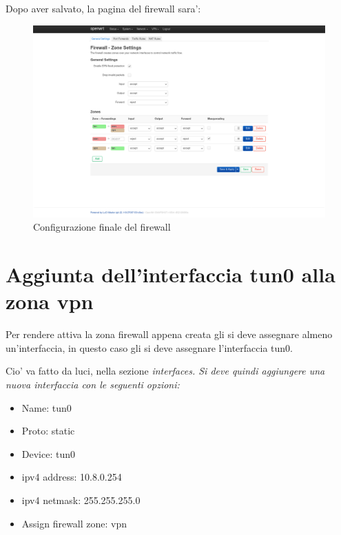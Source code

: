 Dopo aver salvato, la pagina del firewall sara':

\begin{figure}[H]
    \centering
    \includegraphics[width=0.9\linewidth]{immagini/LuCI_firewall_end}
    \caption{Configurazione finale del firewall}
    \label{fig:luci-firewall-end}
\end{figure}

\section{Aggiunta dell'interfaccia tun0 alla zona vpn}

Per rendere attiva la zona firewall appena creata gli si deve assegnare almeno un'interfaccia, in questo caso gli si deve assegnare l'interfaccia tun0.

Cio' va fatto da luci, nella sezione \it{interfaces}. Si deve quindi aggiungere una nuova interfaccia con le seguenti opzioni:
\begin{itemize}
    \item Name: tun0
    \item Proto: static
    \item Device: tun0
    \item ipv4 address: 10.8.0.254
    \item ipv4 netmask: 255.255.255.0
    \item Assign firewall zone: vpn
\end{itemize}

